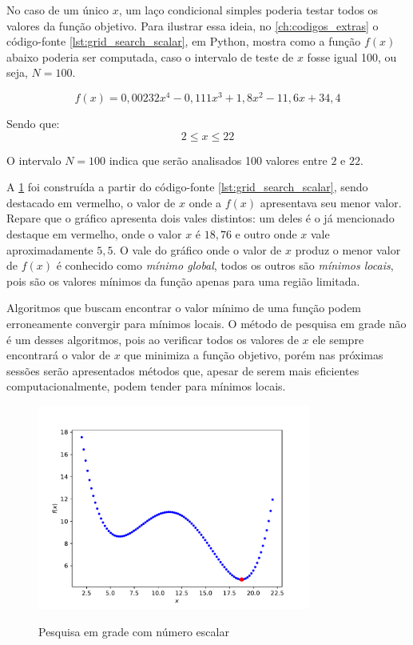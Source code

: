 No caso de um único $x$, um laço condicional simples poderia testar todos os valores da
função objetivo. Para ilustrar essa ideia, no \cref{ch:codigos_extras} o
código-fonte \ref{lst:grid_search_scalar}, em Python, mostra como a função $f(x)$ abaixo
poderia ser computada, caso o intervalo de teste de $x$ fosse igual 100, ou seja, $N = 100$.

\begin{equation}
	\label{eq:grid_search_scalar}
	f(x) = 0,00232x^4 - 0,111x^3 + 1,8x^2 - 11,6x + 34,4
\end{equation}

Sendo que:
\[	2 \leq x \leq 22 \]

O intervalo $N = 100$ indica que serão analisados 100 valores entre $2$ e $22$.

A \cref{fig:grid_search_scalar} foi construída a partir do código-fonte \ref{lst:grid_search_scalar},
sendo destacado em vermelho, o valor de $x$ onde a $f(x)$ apresentava seu menor valor.
Repare que o gráfico apresenta dois vales distintos: um deles é o já mencionado
destaque em vermelho, onde o valor $x$ é $18,76$ e outro onde $x$ vale
aproximadamente $5,5$. O vale do gráfico onde o valor de $x$ produz o menor valor
de $f(x)$ é conhecido como \textit{mínimo global}, todos os outros são
\textit{mínimos locais}, pois são os valores mínimos da função apenas para uma
região limitada.

Algoritmos que buscam encontrar o valor mínimo de uma função podem erroneamente
convergir para mínimos locais. O método de pesquisa em grade não é um desses
algoritmos, pois ao verificar todos os valores de $x$ ele sempre encontrará o
valor de $x$ que minimiza a função objetivo, porém nas próximas sessões serão
apresentados métodos que, apesar de serem mais eficientes computacionalmente,
podem tender para mínimos locais.
	
\begin{figure}
	\caption{Pesquisa em grade com número escalar}
	\begin{center}
		\includegraphics[width=0.8\textwidth]{./5_images/fig_grid_search_scalar.pdf} 
		\label{fig:grid_search_scalar}
	\end{center}
	\centering
\end{figure}

